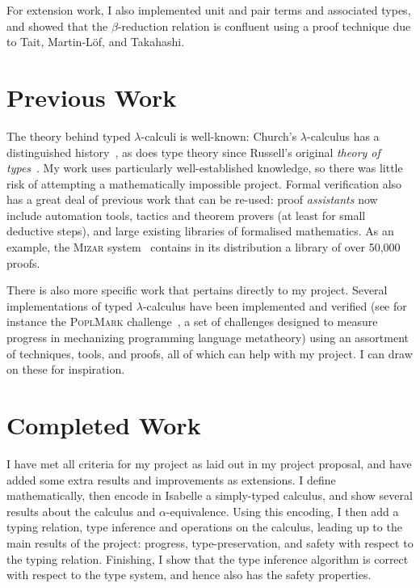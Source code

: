 For extension work, I also implemented unit and pair terms and associated types, and showed that the \(\beta\)-reduction relation is confluent using a proof technique due to Tait, Martin-L\"of, and Takahashi.

\section{Previous Work}
The theory behind typed \(\lambda\)-calculi is well-known: Church's \(\lambda\)-calculus has a distinguished history~\cite{lambda-history}, as does type theory since Russell's original \emph{theory of types}~\cite{russell}.
My work uses particularly well-established knowledge, so there was little risk of attempting a mathematically impossible project.
Formal verification also has a great deal of previous work that can be re-used: proof \emph{assistants} now include automation tools, tactics and theorem provers (at least for small deductive steps), and large existing libraries of formalised mathematics.
As an example, the \textsc{Mizar} system~\cite{mizar} contains in its distribution a library of over 50,000 proofs.

There is also more specific work that pertains directly to my project.
Several implementations of typed \(\lambda\)-calculus have been implemented and verified (see for instance the \textsc{PoplMark} challenge~\cite{poplmark}, a set of challenges designed to measure progress in mechanizing programming language metatheory) using an assortment of techniques, tools, and proofs, all of which can help with my project.
I can draw on these for inspiration.

\section{Completed Work}
I have met all criteria for my project as laid out in my project proposal, and have added some extra results and improvements as extensions.
I define mathematically, then encode in Isabelle a simply-typed calculus, and show several results about the calculus and \(\alpha\)-equivalence.
Using this encoding, I then add a typing relation, type inference and operations on the calculus, leading up to the main results of the project: progress, type-preservation, and safety with respect to the typing relation.
Finishing, I show that the type inference algorithm is correct with respect to the type system, and hence also has the safety properties.
